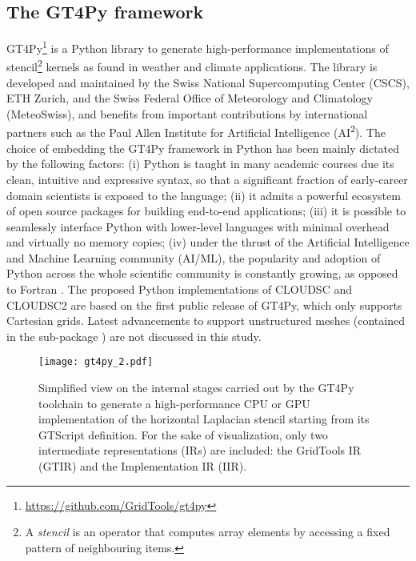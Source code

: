 \documentclass[../main.tex]{subfiles}
\begin{document}
    \subsection{The GT4Py framework}
    \label{section:gt4py}

        GT4Py\footnote{\url{https://github.com/GridTools/gt4py}} is a Python library to generate high-performance implementations of stencil\footnote{A \emph{stencil} is an operator that computes array elements by accessing a fixed pattern of neighbouring items.} kernels as found in weather and climate applications. The library is developed and maintained by the Swiss National Supercomputing Center (CSCS), ETH Zurich, and the Swiss Federal Office of Meteorology and Climatology (MeteoSwiss), and benefits from important contributions by international partners such as the Paul Allen Institute for Artificial Intelligence (AI\textsuperscript{2}). The choice of embedding the GT4Py framework in Python has been mainly dictated by the following factors: (i) Python is taught in many academic courses due its clean, intuitive and expressive syntax, so that a significant fraction of early-career domain scientists is exposed to the language; (ii) it admits a powerful ecosystem of open source packages for building end-to-end applications; (iii) it is possible to seamlessly interface Python with lower-level languages with minimal overhead and virtually no memory copies; (iv) under the thrust of the Artificial Intelligence and Machine Learning community (AI/ML), the popularity and adoption of Python across the whole scientific community is constantly growing, as opposed to Fortran \citep{shipman23}. The proposed Python implementations of CLOUDSC and CLOUDSC2 are based on the first public release of GT4Py, which only supports Cartesian grids. Latest advancements to support unstructured meshes (contained in the sub-package ) are not discussed in this study.

        \begin{figure}[t!]
            \centering
            \texttt{[image: gt4py\_2.pdf]}
            \caption{Simplified view on the internal stages carried out by the GT4Py toolchain to generate a high-performance CPU or GPU implementation of the horizontal Laplacian stencil starting from its GTScript definition. For the sake of visualization, only two intermediate representations (IRs) are included: the GridTools IR (GTIR) and the Implementation IR (IIR). }
            \label{fig:gt4py}
        \end{figure}
\end{document}
